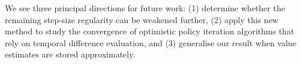 We see three principal directions for future work:
(1) determine whether the remaining step-size regularity can be weakened further,
(2) apply this new method to study the convergence of optimistic policy iteration algorithms that rely on temporal difference evaluation,
and (3) generalise our result when value estimates are stored approximately.













\clearpage
